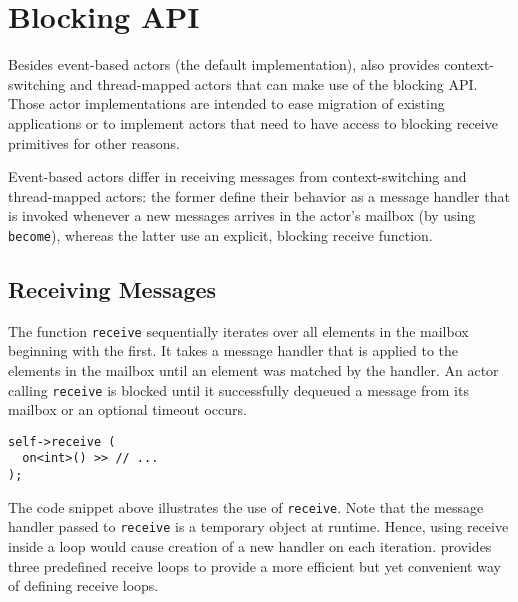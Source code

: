 \section{Blocking API}
\label{blocking-api}

Besides event-based actors (the default implementation), \lib also provides context-switching and thread-mapped actors that can make use of the blocking API.
Those actor implementations are intended to ease migration of existing applications or to implement actors that need to have access to blocking receive primitives for other reasons.

Event-based actors differ in receiving messages from context-switching and thread-mapped actors: the former define their behavior as a message handler that is invoked whenever a new messages arrives in the actor's mailbox (by using \lstinline^become^), whereas the latter use an explicit, blocking receive function.

\subsection{Receiving Messages}

The function \lstinline^receive^ sequentially iterates over all elements in the mailbox beginning with the first.
It takes a message handler that is applied to the elements in the mailbox until an element was matched by the handler.
An actor calling \lstinline^receive^ is blocked until it successfully dequeued a message from its mailbox or an optional timeout occurs.

\begin{lstlisting}
self->receive (
  on<int>() >> // ...
);
\end{lstlisting}

The code snippet above illustrates the use of \lstinline^receive^.
Note that the message handler passed to \lstinline^receive^ is a temporary object at runtime.
Hence, using receive inside a loop would cause creation of a new handler on each iteration.
\lib provides three predefined receive loops to provide a more efficient but yet convenient way of defining receive loops.


